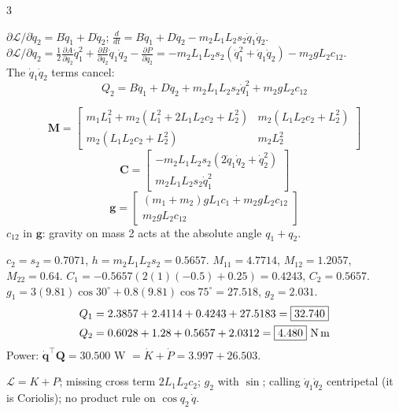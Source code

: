 \begin{multicols}{3}
\begin{deriv}
\end{deriv}
\begin{deriv}
$\partial\mathcal L/\partial\dot q_2=B\dot q_1+D\dot q_2$; $\tfrac d{dt}=B\ddot q_1+D\ddot q_2-m_2L_1L_2s_2\dot q_1\dot q_2$.\\
$\partial\mathcal L/\partial q_2=\tfrac12\tfrac{\partial A}{\partial q_2}\dot q_1^2+\tfrac{\partial B}{\partial q_2}\dot q_1\dot q_2-\tfrac{\partial P}{\partial q_2}=-m_2L_1L_2s_2(\dot q_1^2+\dot q_1\dot q_2)-m_2gL_2c_{12}$.\\
The $\dot q_1\dot q_2$ terms cancel:
\[Q_2=B\ddot q_1+D\ddot q_2+m_2L_1L_2s_2\dot q_1^2+m_2gL_2c_{12}\]
\end{deriv}
\begin{fbx}[Result $\mathbf Q=\mathbf M\ddot{\mathbf q}+\mathbf C+\mathbf g$ \pg{24--25}]
\[\mathbf M=\begin{bmatrix}m_1L_1^2{+}m_2(L_1^2{+}2L_1L_2c_2{+}L_2^2)&m_2(L_1L_2c_2{+}L_2^2)\\m_2(L_1L_2c_2{+}L_2^2)&m_2L_2^2\end{bmatrix}\]
\[\mathbf C=\begin{bmatrix}-m_2L_1L_2s_2(2\dot q_1\dot q_2{+}\dot q_2^2)\\m_2L_1L_2s_2\dot q_1^2\end{bmatrix}\]
\[\mathbf g=\begin{bmatrix}(m_1{+}m_2)gL_1c_1+m_2gL_2c_{12}\\m_2gL_2c_{12}\end{bmatrix}\]
$c_{12}$ in $\mathbf g$: gravity on mass 2 acts at the absolute angle $q_1{+}q_2$.
\end{fbx}
\begin{worked}[$m=(2,1)$, $L=(1,0.8)$, $q=(30^\circ,45^\circ)$, $\dot q=(1,-0.5)$, $\ddot q=(0.5,2)$]
$c_2=s_2=0.7071$, $h=m_2L_1L_2s_2=0.5657$. $M_{11}=4.7714$, $M_{12}=1.2057$, $M_{22}=0.64$. $C_1=-0.5657(2(1)(-0.5)+0.25)=0.4243$, $C_2=0.5657$. $g_1=3(9.81)\cos30^\circ+0.8(9.81)\cos75^\circ=27.518$, $g_2=2.031$.
\begin{align*}Q_1&=2.3857+2.4114+0.4243+27.5183=\boxed{32.740}\\Q_2&=0.6028+1.28+0.5657+2.0312=\boxed{4.480}\ \text{N\,m}\end{align*}
Power: $\dot{\mathbf q}^\top\mathbf Q=30.500$ W $=\dot K+\dot P=3.997+26.503$. \chk
\end{worked}
\begin{trap}
$\mathcal L=K+P$; missing cross term $2L_1L_2c_2$; $g_2$ with $\sin$; calling $\dot q_1\dot q_2$ centripetal (it is Coriolis); no product rule on $\cos q_2\,\dot q$.
\end{trap}


\end{multicols}
